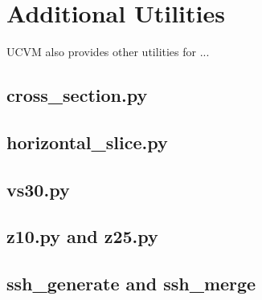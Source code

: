 
\section{Additional Utilities}
\label{sec:utilities}

UCVM also provides other utilities for ...

\subsection{cross\_section.py}

\subsection{horizontal\_slice.py}

\subsection{vs30.py}

\subsection{z10.py and z25.py}

\subsection{ssh\_generate and ssh\_merge}
